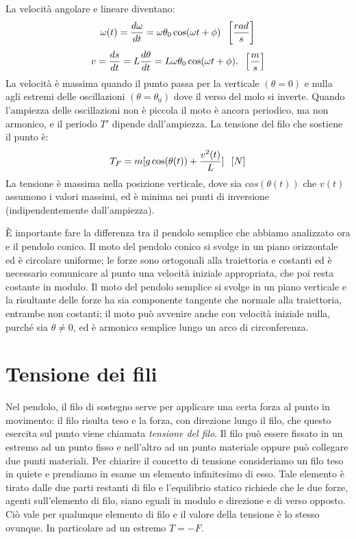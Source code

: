 \documentclass[class=book, crop=false, oneside, 12pt]{standalone}
\begin{document}
La velocità angolare e lineare diventano:
\begin{equation}
    \omega (t) = \frac{d \omega}{dt} = \omega \theta_0 \cos (\omega t + \phi) \hspace{0.2cm} \left[\frac{rad}{s}\right]
\end{equation}
\begin{equation}
    v = \frac{d s}{dt} = L \frac{d \theta}{ dt} = L \omega \theta_0 \cos (\omega t +\phi). \hspace{0.2cm} \left[\frac{m}{s}\right]
\end{equation}
La velocità è massima quando il punto passa per la verticale \((\theta = 0)\) e nulla agli estremi delle oscillazioni \((\theta= \theta_0)\) dove il verso del molo si inverte.\newline
Quando l'ampiezza delle oscillazioni non è piccola il moto è ancora periodico, ma non armonico, e il periodo \(T'\) dipende dall'ampiezza.\newline
La tensione del filo che sostiene il punto è:
\begin{equation}
    T_F = m [ g \cos ( \theta(t) ) + \frac{v^2(t)}{L} ] \hspace{0.2cm} \left[N\right]
\end{equation}
La tensione è massima nella posizione verticale, dove sia \(cos  (\theta (t))\) che \(v(t)\) assumono i valori massimi, ed è minima nei punti di inversione (indipendentemente dall'ampiezza).

È importante fare la differenza tra il pendolo semplice che abbiamo analizzato ora e il pendolo conico.
Il moto del pendolo conico si svolge in un piano orizzontale ed è circolare uniforme; le forze sono ortogonali alla traiettoria e costanti ed è necessario comunicare al punto una velocità iniziale appropriata, che poi resta costante in modulo.
Il moto del pendolo semplice si svolge in un piano verticale e la risultante delle forze ha sia componente tangente che normale alla traiettoria, entrambe non costanti; il moto può avvenire anche con velocità iniziale nulla, purché sia \(\theta \neq 0\), ed è armonico semplice lungo un arco di circonferenza.

\section{Tensione dei fili}

Nel pendolo, il filo di sostegno serve per applicare una certa forza al punto in movimento: il filo risulta teso e la forza, con direzione lungo il filo, che questo esercita sul punto viene chiamata \emph{tensione del filo}. Il filo può essere fissato in un estremo ad un punto fisso e nell'altro ad un punto materiale oppure può collegare due punti materiali.\newline
Per chiarire il concetto di tensione consideriamo un filo teso in quiete e prendiamo in esame un elemento infinitesimo di esso. Tale elemento è tirato dalle due parti restanti di filo e l'equilibrio statico richiede che le due forze, agenti sull'elemento di filo, siano eguali in modulo e direzione e di verso opposto.\newline
Ciò vale per qualunque elemento di filo e il valore della tensione è lo stesso ovunque. In particolare ad un estremo \(T = -F\).
\end{document}
